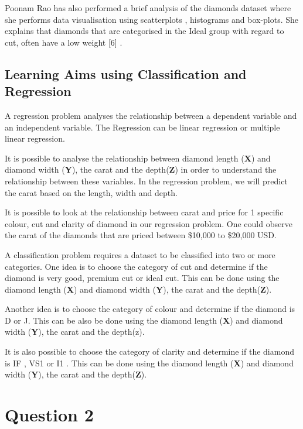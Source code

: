 \documentclass[
]{article}
\begin{document}
Poonam Rao has also performed a brief analysis of the diamonds dataset
where she performs data visualisation using scatterplots , histograms
and box-plots. She explains that diamonds that are categorised in the
Ideal group with regard to cut, often have a low weight {[}6{]} .

\subsection{Learning Aims using Classification and
Regression}\label{learning-aims-using-classification-and-regression}

A regression problem analyses the relationship between a dependent
variable and an independent variable. The Regression can be linear
regression or multiple linear regression.

It is possible to analyse the relationship between diamond length
(\textbf{X}) and diamond width (\textbf{Y}), the carat and the
depth(\textbf{Z}) in order to understand the relationship between these
variables. In the regression problem, we will predict the carat based on
the length, width and depth.

It is possible to look at the relationship between carat and price for 1
specific colour, cut and clarity of diamond in our regression problem.
One could observe the carat of the diamonds that are priced between
\$10,000 to \$20,000 USD.

A classification problem requires a dataset to be classified into two or
more categories. One idea is to choose the category of cut and determine
if the diamond is very good, premium cut or ideal cut. This can be done
using the diamond length (\textbf{X}) and diamond width (\textbf{Y}),
the carat and the depth(\textbf{Z}).

Another idea is to choose the category of colour and determine if the
diamond is D or J. This can be also be done using the diamond length
(\textbf{X}) and diamond width (\textbf{Y}), the carat and the depth(z).

It is also possible to choose the category of clarity and determine if
the diamond is IF , VS1 or I1 . This can be done using the diamond
length (\textbf{X}) and diamond width (\textbf{Y}), the carat and the
depth(\textbf{Z}). \newpage

\section{Question 2}\label{question-2}
\end{document}
